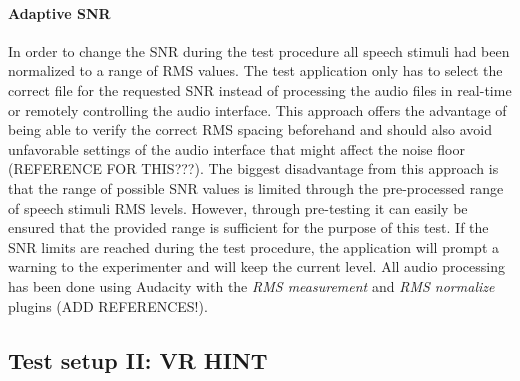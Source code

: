 \documentclass[a4paper,11pt]{article}%
\renewcommand{\\}{\vspace*{0.5\baselineskip} \newline}
\begin{document}
{{\paragraph{Adaptive SNR} In order to change the \ac{SNR} during the test procedure all speech stimuli had been normalized to a range of \ac{RMS} values. The test application only has to select the correct file for the requested \ac{SNR} instead of processing the audio files in real-time or remotely controlling the audio interface. This approach offers the advantage of being able to verify the correct \ac{RMS} spacing beforehand and should also avoid unfavorable settings of the audio interface that might affect the noise floor (REFERENCE FOR THIS???). The biggest disadvantage from this approach is that the range of possible \ac{SNR} values is limited through the pre-processed range of speech stimuli \ac{RMS} levels. However, through pre-testing it can easily be ensured that the provided range is sufficient for the purpose of this test. If the \ac{SNR} limits are reached during the test procedure, the application will prompt a warning to the experimenter and will keep the current level.
\newline
\newline
All audio processing has been done using Audacity with the \textit{\ac{RMS} measurement} and \textit{\ac{RMS} normalize} plugins (ADD REFERENCES!).


\subsection{Test setup II: VR HINT}


}}
\end{document}
